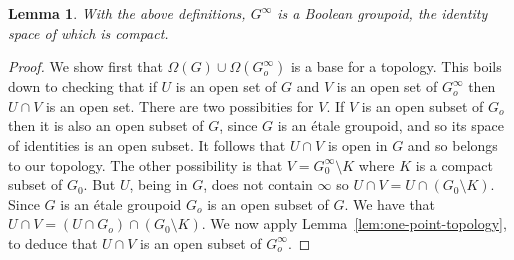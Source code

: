 \documentclass[a4paper]{amsart}
\newtheorem{lemma}[theorem]{Lemma}
\begin{document}
\begin{lemma}\label{lem:one-point-groupoid} With the above definitions, 
$G^{\infty}$ is a Boolean groupoid, the identity space of which is compact.
\end{lemma}
\begin{proof} We show first that $\Omega (G) \cup \Omega (G_{o}^{\infty})$ is a base for a topology.
This boils down to checking that if $U$ is an open set of $G$ and $V$ is an open set of $G_{o}^{\infty}$
then $U \cap V$ is an open set.
There are two possibities for $V$.
If $V$ is an open subset of $G_{o}$ then it is also an open subset of $G$, since $G$ is an \'etale groupoid,
and so its space of identities is an open subset.
It follows that $U \cap V$ is open in $G$ and so belongs to our topology.
The other possibility is that $V = G_{0}^{\infty} \setminus K$ where $K$ is a compact subset of $G_{0}$.
But $U$, being in $G$, does not contain $\infty$ so $U \cap V = U \cap (G_{0} \setminus K)$.
Since $G$ is an \'etale groupoid $G_{o}$ is an open subset of $G$. 
We have that $U \cap V = (U \cap G_{o}) \cap (G_{0} \setminus K)$.
We now apply Lemma~\ref{lem:one-point-topology}, to deduce that $U \cap V$ is an open subset of  $G_{o}^{\infty}$.


\end{proof}
\end{document}
